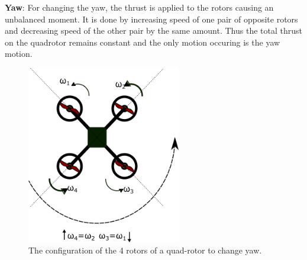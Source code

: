 \documentclass[hidelinks,BTech]{iitmdiss}
\begin{document}
{\bf Yaw}: For changing the yaw, the thrust is applied to the rotors causing an unbalanced moment. It is done by increasing speed of one pair of opposite rotors and decreasing speed of the other pair by the same amount. Thus the total thrust on the quadrotor remains constant and the only motion occuring is the yaw motion.
\begin{figure}[H]
  \centering
    \includegraphics[width=0.6\textwidth]{Quadrotor_yaw.png}
    \caption{The configuration of the 4 rotors of a quad-rotor to change yaw.}
\end{figure}
\end{document}
